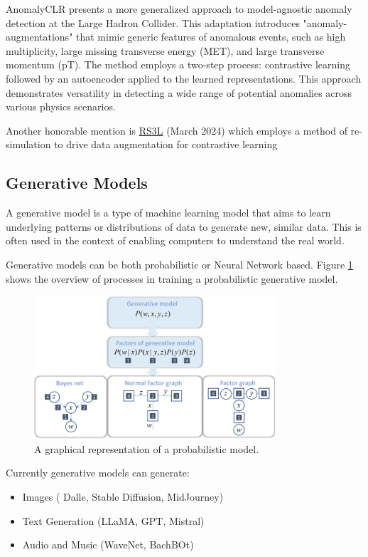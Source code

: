 \documentclass[letterpaper,12pt]{article}
\begin{document}
\begin{spacing}{1.125}
\begin{itemize}
AnomalyCLR presents a more generalized approach to model-agnostic anomaly detection at the Large Hadron Collider. This adaptation introduces "anomaly-augmentations" that mimic generic features of anomalous events, such as high multiplicity, large missing transverse energy (MET), and large transverse momentum (pT). The method employs a two-step process: contrastive learning followed by an autoencoder applied to the learned representations. This approach demonstrates versatility in detecting a wide range of potential anomalies across various physics scenarios.

\end{itemize}
Another honorable mention is \href{https://arxiv.org/abs/2403.07066v1}{RS3L}
(March 2024) which employs a method of
re-simulation to drive
data augmentation for contrastive learning

\subsection{Generative Models}

A generative model is a type of machine learning model that aims to learn underlying patterns or
distributions of data to generate new, similar data.
This is often used in the context of enabling computers to understand the real world.

Generative models can be both probabilistic or Neural Network based. Figure
\ref{generate} shows the overview of processes in training a probabilistic generative
model.

\begin{figure}[!htb]
  \includegraphics[width=0.8\textwidth]{generative.png}
  \caption{A graphical representation of a probabilistic model.}
  \label{generate}
\end{figure}

Currently generative models
can generate:
\begin{itemize}
\item Images ( Dalle, Stable Diffusion, MidJourney)
\item Text Generation (LLaMA, GPT, Mistral)
\item Audio and Music (WaveNet, BachBOt)
\end{itemize}


\end{spacing}
\end{document}
